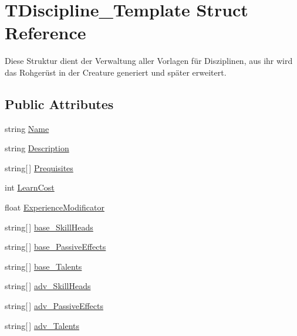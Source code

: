 \hypertarget{struct_t_discipline___template}{}\section{T\+Discipline\+\_\+\+Template Struct Reference}
\label{struct_t_discipline___template}


Diese Struktur dient der Verwaltung aller Vorlagen für Disziplinen, aus ihr wird das Rohgerüst in der Creature generiert und später erweitert.  


\subsection*{Public Attributes}
\begin{DoxyCompactItemize}
\item 
string \hyperlink{struct_t_discipline___template_aae835040a77ff49d836137add218d1ce}{Name}
\item 
string \hyperlink{struct_t_discipline___template_a4dc7bdb0cda5842e90e98457020d54cf}{Description}
\item 
string\mbox{[}$\,$\mbox{]} \hyperlink{struct_t_discipline___template_a3ea2df44f609935eb4f04eda1a6434d0}{Prequisites}
\item 
int \hyperlink{struct_t_discipline___template_a6bfe46a4f49b4de80840a81eccdb0393}{Learn\+Cost}
\item 
float \hyperlink{struct_t_discipline___template_a3b3489a37b73856250147d782db4b436}{Experience\+Modificator}
\item 
string\mbox{[}$\,$\mbox{]} \hyperlink{struct_t_discipline___template_aec2a4f16caf01c371224b0f67059cb74}{base\+\_\+\+Skill\+Heads}
\item 
string\mbox{[}$\,$\mbox{]} \hyperlink{struct_t_discipline___template_afa71992d7f467f7eaa7f1f4d0dc7d05e}{base\+\_\+\+Passive\+Effects}
\item 
string\mbox{[}$\,$\mbox{]} \hyperlink{struct_t_discipline___template_afb9d738ec47776f7c3dfc98e2507991b}{base\+\_\+\+Talents}
\item 
string\mbox{[}$\,$\mbox{]} \hyperlink{struct_t_discipline___template_a1975713cc5f1b6d530c96590762bead9}{adv\+\_\+\+Skill\+Heads}
\item 
string\mbox{[}$\,$\mbox{]} \hyperlink{struct_t_discipline___template_a1e6c01aeec904a02d565947aa2b1d0ba}{adv\+\_\+\+Passive\+Effects}
\item 
string\mbox{[}$\,$\mbox{]} \hyperlink{struct_t_discipline___template_ada6372f9138e4a582b84926fcd631c93}{adv\+\_\+\+Talents}
\end{DoxyCompactItemize}


